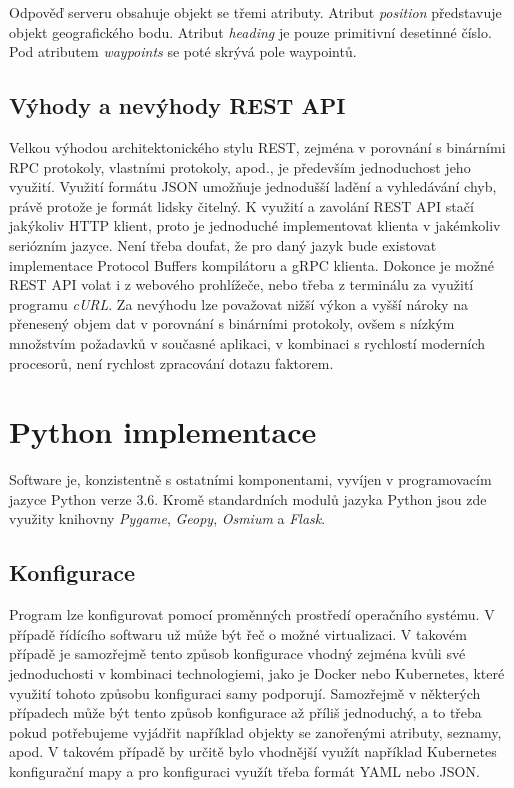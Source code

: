 \documentclass[czech, bachelor]{diploma}
\begin{document}
Odpověď serveru obsahuje objekt se třemi atributy. Atribut \emph{position} představuje objekt geografického bodu. Atribut
\emph{heading} je pouze primitivní desetinné číslo. Pod atributem \emph{waypoints} se poté skrývá pole waypointů.

\subsection{Výhody a nevýhody REST API}

Velkou výhodou architektonického stylu REST, zejména v porovnání s binárními RPC protokoly, vlastními protokoly, apod., je
především jednoduchost jeho využití. Využití formátu JSON umožňuje jednodušší ladění a vyhledávání chyb, právě protože je formát
lidsky čitelný. K využití a zavolání REST API stačí jakýkoliv HTTP klient, proto je jednoduché implementovat klienta v jakémkoliv
seriózním jazyce. Není třeba doufat, že pro daný jazyk bude existovat implementace Protocol Buffers kompilátoru a gRPC klienta.
Dokonce je možné REST API volat i z webového prohlížeče, nebo třeba z terminálu za využití programu \emph{cURL}. Za nevýhodu lze
považovat nižší výkon a vyšší nároky na přenesený objem dat v porovnání s binárními protokoly, ovšem s nízkým množstvím požadavků
v současné aplikaci, v kombinaci s rychlostí moderních procesorů, není rychlost zpracování dotazu faktorem.

\section{Python implementace}

Software je, konzistentně s ostatními komponentami, vyvíjen v programovacím jazyce Python verze 3.6. Kromě standardních modulů
jazyka Python jsou zde využity knihovny \emph{Pygame}, \emph{Geopy}, \emph{Osmium} a \emph{Flask}.

\subsection{Konfigurace}

Program lze konfigurovat pomocí proměnných prostředí operačního systému. V případě řídícího softwaru už může být řeč o možné
virtualizaci. V takovém případě je samozřejmě tento způsob konfigurace vhodný zejména kvůli své jednoduchosti v kombinaci
technologiemi, jako je Docker nebo Kubernetes, které využití tohoto způsobu konfiguraci samy podporují. Samozřejmě v některých
případech může být tento způsob konfigurace až příliš jednoduchý, a to třeba pokud potřebujeme vyjádřit například objekty
se zanořenými atributy, seznamy, apod. V takovém případě by určitě bylo vhodnější využít například Kubernetes konfigurační mapy
a pro konfiguraci využít třeba formát YAML nebo JSON.
\end{document}
